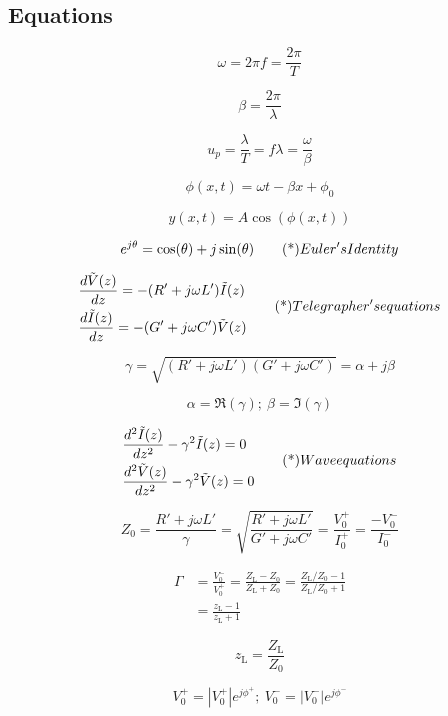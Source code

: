 \documentclass[letterpaper, 10pt]{article}
\begin{document}
\begin{multicols*}{4}
  \section{Equations}
  
  \[\label{eq:angularVelocity}
    \omega = 2\pi f = \frac{2\pi}{T}\]
  
  \[\label{eq:phaseConstLambda}\beta = \frac{2\pi}{\lambda}\]

  \[\label{eq:phaseVelocity}
    u_p = \frac{\lambda}{T} = f\lambda = \frac{\omega}{\beta}\]

  \[\phi(x, t) = \omega t - \beta x + \phi_0\]

  \[y(x, t) = A\cos(\phi(x, t))\] 

  \[e^{j\theta}=\cos(\theta) + j\sin(\theta)
    \eqd{Euler's Identity}\]

  \[\label{eq:telegraphers}
    \begin{aligned}
      &\frac{d\tilde{V}(z)}{dz} = -(R' + j\omega L')\tilde{I}(z) \\
      &\frac{d\tilde{I}(z)}{dz} = -(G' + j\omega C')\tilde{V}(z)
    \end{aligned} \eqd{Telegrapher's equations}\]
  
  \[\gamma = \sqrt{(R'+j\omega L')(G'+j\omega C')} =\alpha+j\beta\] 

  \[\alpha = \Re(\gamma); \ \beta = \Im(\gamma)\]

  \[\label{eq:wave}
    \begin{aligned}
      &\frac{d^2\tilde{I}(z)}{dz^2}-\gamma^2\tilde{I}(z) = 0 \\
      &\frac{d^2\tilde{V}(z)}{dz^2}-\gamma^2\tilde{V}(z) = 0
    \end{aligned}\eqd{Wave equations}\]
  
  \[\label{eq:characterImpedance}
    Z_0=\frac{R'+j\omega L'}{\gamma} = \sqrt{\frac{R'+j\omega L'}{G'+j\omega C'}} = \frac{V_0^+}{I_0^+}=\frac{-V_0^-}{I_0^-}\]

  \[\label{eq:voltageReflection}\begin{aligned}
      \Gamma&=\frac{V_0^-}{V_0^+}=\frac{Z_{\text{L}}-Z_0}{Z_{\text{L}}+Z_0}=\frac{Z_{\text{L}}/Z_0-1}{Z_{\text{L}}/Z_0+1} \\
      &=\frac{z_{\text{L}} -1}{z_{\text{L}}+1} \end{aligned} \]

  \[\label{normalizedLoadImpedance} z_{\text{L}} = \frac{Z_{\text{L}}}{Z_0} \]

  \[V_0^+=|V_0^+|e^{j\phi^+}; \ V_0^-=|V_0^-|e^{j\phi^-}\]


\end{multicols*}
\end{document}
